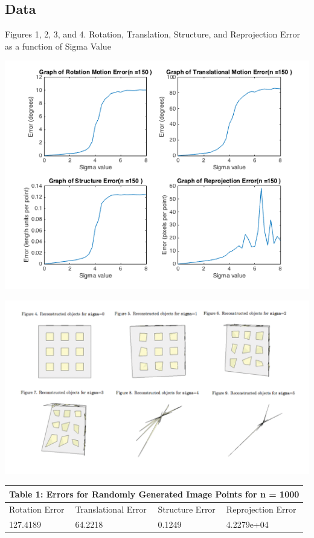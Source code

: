 \documentclass{article}
\begin{document}
\subsection{Data}
\begin{center}
	\begin{center}Figures 1, 2, 3, and 4. Rotation, Translation, Structure, and Reprojection Error as a function of Sigma Value\end{center}
	\includegraphics[width=.7\textwidth,keepaspectratio]{experiment_1_error_plots.png}

	\includegraphics[width=\textwidth,keepaspectratio]{reconstructed_objects.png}
\end{center}


\begin{tabular}{ |p{3cm}|p{3cm}|p{3cm}|p{3cm}|  }
 \hline
 \multicolumn{4}{|c|}{Table 1: Errors for Randomly Generated Image Points for n = 1000} \\
 \hline
 Rotation Error & Translational Error & Structure Error & Reprojection Error\\
 \hline
 127.4189 & 64.2218 & 0.1249 & 4.2279e+04\\
 \hline
\end{tabular}
\end{document}

